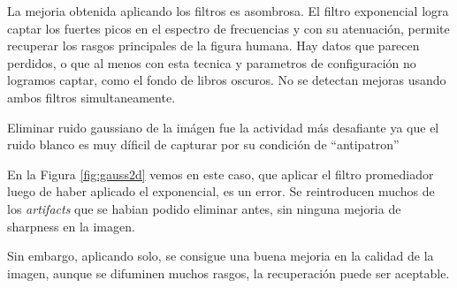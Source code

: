 La mejoria obtenida aplicando los filtros es asombrosa.
El filtro exponencial logra captar los fuertes picos en el espectro de
frecuencias y con su atenuaci\'on, permite recuperar los rasgos principales
de la figura humana.
Hay datos que parecen perdidos, o que al menos con esta tecnica y
parametros de configuraci\'on no logramos captar, como el fondo de
libros oscuros.
No se detectan mejoras usando ambos filtros simultaneamente.

Eliminar ruido gaussiano de la im\'agen fue la actividad m\'as desafiante
ya que el ruido blanco es muy d\'ificil de
capturar por su condici\'on de ``antipatron''


En la Figura \ref{fig:gauss2d} vemos en este caso, que aplicar el filtro
promediador luego de haber aplicado el exponencial, es un error. 
Se reintroducen muchos de los \textit{artifacts} que se habian podido
eliminar antes, sin ninguna mejoria de sharpness en la imagen. 

Sin embargo, aplicando solo, se consigue una buena mejoria en la calidad
de la imagen, aunque se difuminen muchos rasgos, la recuperaci\'on puede ser aceptable.
